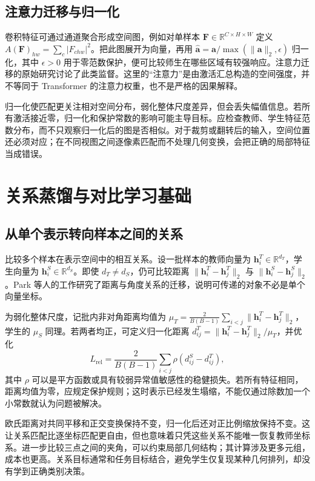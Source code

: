 \documentclass[UTF8,12pt,a4paper,fontset=fandol]{ctexart}
\begin{document}
\subsection{注意力迁移与归一化}
卷积特征可通过通道聚合形成空间图，例如对单样本 $\mathbf F\in\mathbb R^{C\times H\times W}$ 定义 $A(\mathbf F)_{hw}=\sum_c|F_{chw}|^2$。把此图展开为向量，再用 $\widehat{\mathbf a}=\mathbf a/\max(\|\mathbf a\|_2,\epsilon)$ 归一化，其中 $\epsilon>0$ 用于零范数保护，便可比较师生在哪些区域有较强响应。注意力迁移的原始研究讨论了此类监督\cite{zagoruyko2017}。这里的“注意力”是由激活汇总构造的空间强度，并不等同于 Transformer 的注意力权重，也不是严格的因果解释。

归一化使匹配更关注相对空间分布，弱化整体尺度差异，但会丢失幅值信息。若所有激活接近零，归一化和保护常数的影响可能主导目标。应检查教师、学生特征范数分布，而不只观察归一化后的图是否相似。对于裁剪或翻转后的输入，空间位置还必须对应；在不同视图之间逐像素匹配而不处理几何变换，会把正确的局部特征当成错误。

\section{关系蒸馏与对比学习基础}
\label{sec:kd-relation}

\subsection{从单个表示转向样本之间的关系}
比较多个样本在表示空间中的相互关系。设一批样本的教师向量为 $\mathbf h_i^T\in\mathbb R^{d_T}$，学生向量为 $\mathbf h_i^S\in\mathbb R^{d_S}$。即使 $d_T\ne d_S$，仍可比较距离 $\|\mathbf h_i^T-\mathbf h_j^T\|_2$ 与 $\|\mathbf h_i^S-\mathbf h_j^S\|_2$。Park 等人的工作研究了距离与角度关系的迁移\cite{park2019}，说明可传递的对象不必是单个向量坐标。

为弱化整体尺度，记批内非对角距离均值为 $\mu_T=\frac{2}{B(B-1)}\sum_{i<j}\|\mathbf h_i^T-\mathbf h_j^T\|_2$，学生的 $\mu_S$ 同理。若两者均正，可定义归一化距离 $d_{ij}^T=\|\mathbf h_i^T-\mathbf h_j^T\|_2/\mu_T$，并优化
\begin{equation}
 L_{\mathrm{rel}}=\frac{2}{B(B-1)}\sum_{i<j}
 \rho(d_{ij}^S-d_{ij}^T),
 \label{eq:kd-relation-loss}
\end{equation}
其中 $\rho$ 可以是平方函数或具有较弱异常值敏感性的稳健损失。若所有特征相同，距离均值为零，应规定保护规则；这时表示已经发生塌缩，不能仅通过除数加一个小常数就认为问题被解决。

欧氏距离对共同平移和正交变换保持不变，归一化后还对正比例缩放保持不变。这让关系匹配比逐坐标匹配更自由，但也意味着只凭这些关系不能唯一恢复教师坐标系。进一步比较三点之间的夹角，可以约束局部几何结构；其计算涉及更多元组，成本也更高。关系目标通常和任务目标结合，避免学生仅复现某种几何排列，却没有学到正确类别决策。
\end{document}
